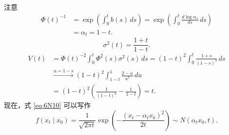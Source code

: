 注意
\begin{equation*}
  \begin{aligned}
  \Phi(t)^{-1}
    &=\exp\left(\int_0^t b(s)\,ds\right)
      =\exp\left(\int_0^t\frac{d\log\alpha_s}{ds}\,ds\right)\\
    &=\alpha_t=1-t.
  \end{aligned}
  \tag{6N11}\label{eq:6N11}
\end{equation*}
\begin{equation*}
  \sigma^2(t)=\frac{1+t}{1-t}.
  \tag{6N12}\label{eq:6N12}
\end{equation*}
\begin{equation*}
  \begin{aligned}
  V(t)&=\Phi(t)^{-2}\int_0^t\Phi^2(s)\sigma^2(s)\,ds
       =(1-t)^2\int_0^t\frac{1+s}{(1-s)^3}\,ds\\
      &\xrightarrow{u=1-s}(1-t)^2\int_{1-t}^1\frac{2-u}{u^3}\,du\\
      &=(1-t)^2\left(\frac{1}{(1-t)^2}-\frac{1}{1-t}\right)=t.
  \end{aligned}
  \tag{6N13}\label{eq:6N13}
\end{equation*}
现在，式 \eqref{eq:6N10} 可以写作
\begin{equation*}
  f(x_t\mid x_0)=\frac{1}{\sqrt{2\pi t}}
    \exp\left(-\frac{(x_t-\alpha_t x_0)^2}{2t}\right)\sim N(\alpha_t x_0,t).
  \tag{6N14}\label{eq:6N14}
\end{equation*}
